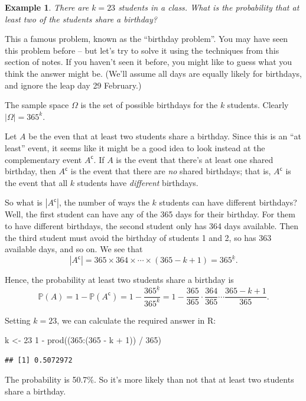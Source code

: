 \documentclass[
  a4paper,
]{book}
\newenvironment{Shaded}{\begin{snugshade}}{\end{snugshade}}
\newcommand{\DecValTok}[1]{\textcolor[rgb]{0.00,0.00,0.81}{#1}}
\newcommand{\FunctionTok}[1]{\textcolor[rgb]{0.00,0.00,0.00}{#1}}
\newcommand{\NormalTok}[1]{#1}
\newcommand{\OtherTok}[1]{\textcolor[rgb]{0.56,0.35,0.01}{#1}}
\newcommand{\SpecialCharTok}[1]{\textcolor[rgb]{0.00,0.00,0.00}{#1}}
\theoremstyle{definition}
\theoremstyle{definition}
\newtheorem{example}{Example}[chapter]
\theoremstyle{definition}
\theoremstyle{definition}
\theoremstyle{remark}
\begin{document}
\begin{example}
\emph{There are \(k = 23\) students in a class. What is the probability that at least two of the students share a birthday?}

This a famous problem, known as the ``birthday problem''. You may have seen this problem before -- but let's try to solve it using the techniques from this section of notes. If you haven't seen it before, you might like to guess what you think the answer might be. (We'll assume all days are equally likely for birthdays, and ignore the leap day 29 February.)

The sample space \(\Omega\) is the set of possible birthdays for the \(k\) students. Clearly \(|\Omega| = 365^k\).

Let \(A\) be the even that at least two students share a birthday. Since this is an ``at least'' event, it seems like it might be a good idea to look instead at the complementary event \(A^\mathsf{c}\). If \(A\) is the event that there's at least one shared birthday, then \(A^\mathsf{c}\) is the event that there are \emph{no} shared birthdays; that is, \(A^\mathsf{c}\) is the event that all \(k\) students have \emph{different} birthdays.

So what is \(|A^\mathsf{c}|\), the number of ways the \(k\) students can have different birthdays? Well, the first student can have any of the 365 days for their birthday. For them to have different birthdays, the second student only has 364 days available. Then the third student must avoid the birthday of students 1 and 2, so has 363 available days, and so on. We see that
\[ |A^\mathsf{c}| = 365 \times 364 \times \cdots \times (365 - k + 1) = 365^{\underline{k}} . \]

Hence, the probability at least two students share a birthday is
\[ \mathbb P(A) = 1 - \mathbb P(A^\mathsf{c}) = 1 - \frac{365^{\underline{k}}}{365^k} = 1 - \frac{365}{365} \cdot \frac{364}{365} \cdots \frac{365-k+1}{365} . \]

Setting \(k = 23\), we can calculate the required answer in R:

\begin{Shaded}
\begin{Highlighting}[]
\NormalTok{k }\OtherTok{\textless{}{-}} \DecValTok{23}
\DecValTok{1} \SpecialCharTok{{-}} \FunctionTok{prod}\NormalTok{((}\DecValTok{365}\SpecialCharTok{:}\NormalTok{(}\DecValTok{365} \SpecialCharTok{{-}}\NormalTok{ k }\SpecialCharTok{+} \DecValTok{1}\NormalTok{)) }\SpecialCharTok{/} \DecValTok{365}\NormalTok{)}
\end{Highlighting}
\end{Shaded}

\begin{verbatim}
## [1] 0.5072972
\end{verbatim}

The probability is 50.7\%. So it's more likely than not that at least two students share a birthday.
\end{example}
\end{document}
